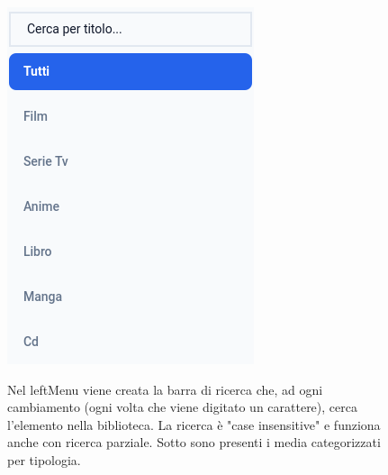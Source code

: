 \documentclass[a4paper,10pt]{article}
\begin{document}
\begin{figure}[ht!]
    \centering
    \begin{minipage}{0.4\textwidth}
        \includegraphics[width=\linewidth]{img/LeftMenu.png}
    \end{minipage}\hfill
    \begin{minipage}{0.55\textwidth}
        \small
        Nel leftMenu viene creata la barra di ricerca che, ad ogni cambiamento (ogni volta che viene digitato un carattere), cerca l’elemento nella biblioteca. La ricerca è  "case insensitive" e funziona anche con ricerca parziale. Sotto sono presenti i media categorizzati per tipologia.
    \end{minipage}
\end{figure}
\end{document}
